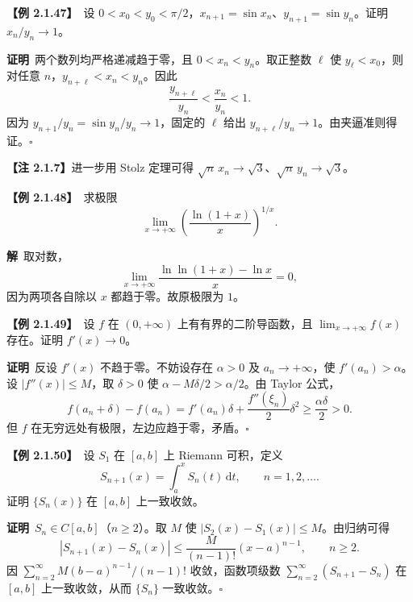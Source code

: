 \documentclass[UTF8,a4paper,11pt]{ctexart}
\newcommand{\ex}[1]{\par\medskip\noindent\textbf{【例 #1】}\ }
\newcommand{\pf}{\par\noindent\textbf{证明}\ }
\newcommand{\sol}{\par\noindent\textbf{解}\ }
\begin{document}
\ex{2.1.47}设 $0<x_0<y_0<\pi/2$，$x_{n+1}=\sin x_n$、$y_{n+1}=\sin y_n$。证明 $x_n/y_n\to1$。
\pf 两个数列均严格递减趋于零，且 $0<x_n<y_n$。取正整数 $\ell$ 使 $y_\ell<x_0$，则对任意 $n$，$y_{n+\ell}<x_n<y_n$。因此
\[
\frac{y_{n+\ell}}{y_n}<\frac{x_n}{y_n}<1.
\]
因为 $y_{n+1}/y_n=\sin y_n/y_n\to1$，固定的 $\ell$ 给出 $y_{n+\ell}/y_n\to1$。由夹逼准则得证。\hfill$\square$

\noindent\textbf{【注 2.1.7】}进一步用 Stolz 定理可得 $\sqrt n\,x_n\to\sqrt3$、$\sqrt n\,y_n\to\sqrt3$。

\ex{2.1.48}求极限
\[
\lim_{x\to+\infty}\left(\frac{\ln(1+x)}x\right)^{1/x}.
\]
\sol 取对数，
\[
\lim_{x\to+\infty}\frac{\ln\ln(1+x)-\ln x}{x}=0,
\]
因为两项各自除以 $x$ 都趋于零。故原极限为 $1$。

\ex{2.1.49}设 $f$ 在 $(0,+\infty)$ 上有有界的二阶导函数，且 $\lim_{x\to+\infty}f(x)$ 存在。证明 $f'(x)\to0$。
\pf 反设 $f'(x)$ 不趋于零。不妨设存在 $\alpha>0$ 及 $a_n\to+\infty$，使 $f'(a_n)>\alpha$。设 $|f''(x)|\le M$，取 $\delta>0$ 使 $\alpha-M\delta/2>\alpha/2$。由 Taylor 公式，
\[
f(a_n+\delta)-f(a_n)
=f'(a_n)\delta+\frac{f''(\xi_n)}2\delta^2
\ge\frac{\alpha\delta}{2}>0.
\]
但 $f$ 在无穷远处有极限，左边应趋于零，矛盾。\hfill$\square$

\ex{2.1.50}设 $S_1$ 在 $[a,b]$ 上 Riemann 可积，定义
\[
S_{n+1}(x)=\int_a^x S_n(t)\,\mathrm dt,\qquad n=1,2,\ldots.
\]
证明 $\{S_n(x)\}$ 在 $[a,b]$ 上一致收敛。
\pf $S_n\in C[a,b]$（$n\ge2$）。取 $M$ 使 $|S_2(x)-S_1(x)|\le M$。由归纳可得
\[
|S_{n+1}(x)-S_n(x)|\le\frac{M}{(n-1)!}(x-a)^{n-1},\qquad n\ge2.
\]
因 $\sum_{n=2}^{\infty}M(b-a)^{n-1}/(n-1)!$ 收敛，函数项级数 $\sum_{n=2}^{\infty}(S_{n+1}-S_n)$ 在 $[a,b]$ 上一致收敛，从而 $\{S_n\}$ 一致收敛。\hfill$\square$
\end{document}
